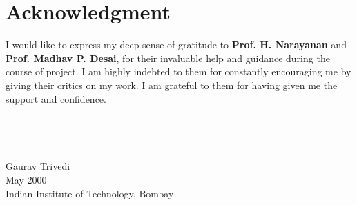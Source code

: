 \chapter*{Acknowledgment}
\vspace{1.0in}
I would like to express my deep sense of gratitude to {\bf Prof. H. Narayanan} and {\bf Prof. Madhav P. Desai}, for their invaluable help and guidance during
the course of project.  I am highly indebted to them for constantly encouraging me by giving their critics on my work. I am grateful to them 
for having given me the support and confidence.
\\
\\
\\
\\
\\
Gaurav Trivedi\\
May 2000\\
{Indian Institute of Technology, Bombay}\\
\newpage